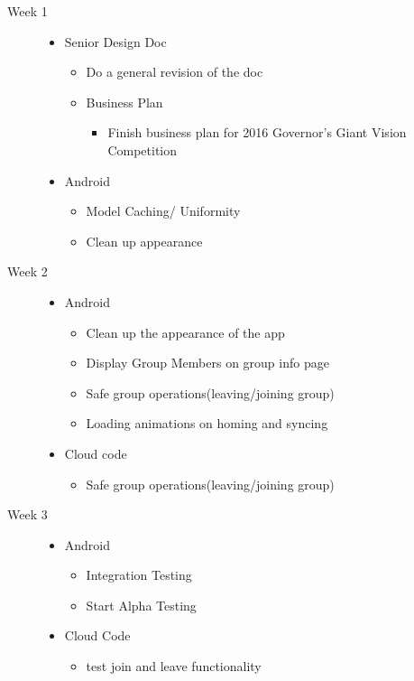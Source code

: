 \documentclass[11pt]{article}
\begin{document}
\begin{description}
	\item[Week 1] \hfill
		\begin{itemize}
		\item Senior Design Doc
		\begin{itemize}
			\item Do a general revision of the doc
		\end{itemize}
		\begin{itemize}
		\item Business Plan
			\begin{itemize}
			\item Finish business plan for 2016 Governor's Giant Vision Competition
			\end{itemize}
		\end{itemize}
		\item Android
		\begin{itemize}
			\item Model Caching/ Uniformity
			\item Clean up appearance
		\end{itemize}
	\end{itemize}
	
  \item[Week 2] \hfill
		\begin{itemize}
		\item Android
		\begin{itemize}
			\item Clean up the appearance of the app
			\item Display Group Members on group info page
			\item Safe group operations(leaving/joining group)
			\item Loading animations on homing and syncing
		\end{itemize}
		\item Cloud code
		\begin{itemize}
			\item Safe group operations(leaving/joining group)
		\end{itemize}
	\end{itemize}
  
  \item[Week 3] \hfill
		\begin{itemize}
		\item Android
		\begin{itemize}
			\item Integration Testing
			\item Start Alpha Testing
		\end{itemize}
		\item Cloud Code
		\begin{itemize}
			\item test join and leave functionality
		\end{itemize}
	\end{itemize}
\end{description}
\end{document}
